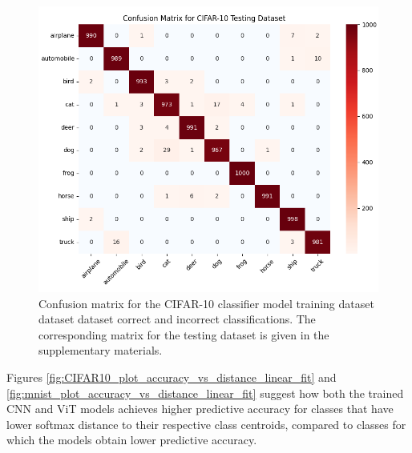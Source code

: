 \begin{figure}[ht]
    \centering   
    \includegraphics[width=0.99\columnwidth]{Figures/cifar10_testing_confusion_matrix.png}
    \caption{Confusion matrix for the CIFAR-10 classifier model training dataset dataset dataset correct and incorrect classifications. The corresponding matrix for the testing dataset is given in the supplementary materials.}
    \label{fig:cifar10_testing_confusion_matrix}
\end{figure}


Figures \ref{fig:CIFAR10_plot_accuracy_vs_distance_linear_fit} and \ref{fig:mnist_plot_accuracy_vs_distance_linear_fit} suggest how both the trained CNN and ViT models achieves higher predictive accuracy for classes that have lower softmax distance to their respective class centroids, compared to classes for which the models obtain lower predictive accuracy.


